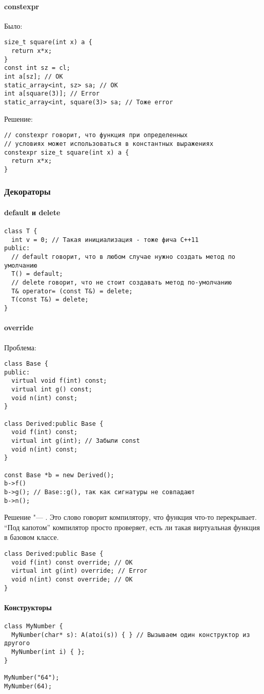 \paragraph{constexpr}
Было:
\begin{verbatim}
size_t square(int x) a {
  return x*x;
}
const int sz = cl;
int a[sz]; // OK
static_array<int, sz> sa; // OK
int a[square(3)]; // Error
static_array<int, square(3)> sa; // Тоже error
\end{verbatim}
Решение:
\begin{verbatim}
// constexpr говорит, что функция при определенных
// условиях может использоваться в константных выражениях
constexpr size_t square(int x) a {
  return x*x;
}
\end{verbatim}

\subsubsection{Декораторы}

\paragraph{default и delete}
\begin{verbatim}
class T {
  int v = 0; // Такая инициализация - тоже фича C++11
public:
  // default говорит, что в любом случае нужно создать метод по умолчанию
  T() = default;
  // delete говорит, что не стоит создавать метод по-умолчанию
  T& operator= (const T&) = delete;
  T(const T&) = delete;
}
\end{verbatim}

\paragraph{override}
Проблема:
\begin{verbatim}
class Base {
public:
  virtual void f(int) const;
  virtual int g() const;
  void n(int) const;
}

class Derived:public Base {
  void f(int) const;
  virtual int g(int); // Забыли const
  void n(int) const;
}

const Base *b = new Derived();
b->f()
b->g(); // Base::g(), так как сигнатуры не совпадают
b->n();
\end{verbatim}
Решение "--- . Это слово говорит компилятору, что функция что-то перекрывает. ``Под капотом'' компилятор просто проверяет, есть ли такая виртуальная функция в базовом классе.
\begin{verbatim}
class Derived:public Base {
  void f(int) const override; // OK
  virtual int g(int) override; // Error
  void n(int) const override; // OK
}
\end{verbatim}

\paragraph{Конструкторы}
\begin{verbatim}
class MyNumber {
  MyNumber(char* s): A(atoi(s)) { } // Вызываем один конструктор из другого
  MyNumber(int i) { };
}

MyNumber("64");
MyNumber(64);
\end{verbatim}
